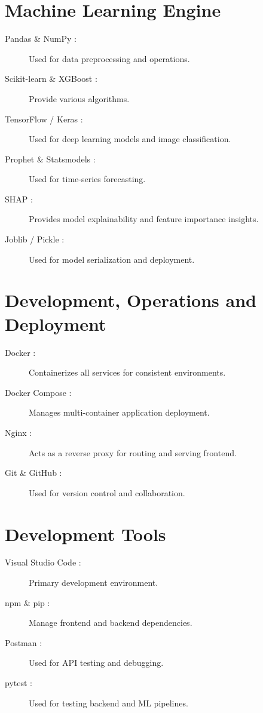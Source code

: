 \section{Machine Learning Engine}

\begin{description}
\item[Pandas \& NumPy :] Used for data preprocessing and operations.
\item[Scikit-learn \& XGBoost :] Provide various algorithms.
\item[TensorFlow / Keras :] Used for deep learning models and image classification.
\item[Prophet \& Statsmodels :] Used for time-series forecasting.
\item[SHAP :] Provides model explainability and feature importance insights.
\item[Joblib / Pickle :] Used for model serialization and deployment.
\end{description}


\section{Development, Operations and Deployment}

\begin{description}
\item[Docker :] Containerizes all services for consistent environments.
\item[Docker Compose :] Manages multi-container application deployment.
\item[Nginx :] Acts as a reverse proxy for routing and serving frontend.
\item[Git \& GitHub :] Used for version control and collaboration.
\end{description}


\section{Development Tools}

\begin{description}
\item[Visual Studio Code :] Primary development environment.
\item[npm \& pip :] Manage frontend and backend dependencies.
\item[Postman :] Used for API testing and debugging.
\item[pytest :] Used for testing backend and ML pipelines.
\end{description}